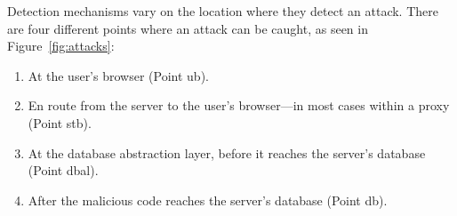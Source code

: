 \documentclass[10pt,journal,compsoc]{IEEEtran}
\begin{document}
Detection mechanisms vary on the location where they detect an attack.
There are four different points where an attack can be caught, as seen
in Figure~\ref{fig:attacks}:

\begin{enumerate}
\item At the user's browser (Point {\sc ub}).
\item En route from the server to the user's browser---in most cases
within a proxy (Point {\sc s}t{\sc b}).
\item At the database abstraction layer, before it reaches the server's database
  (Point {\sc dbal}).
\item After the malicious code reaches the server's database
  (Point {\sc db}).
\end{enumerate}
\end{document}
